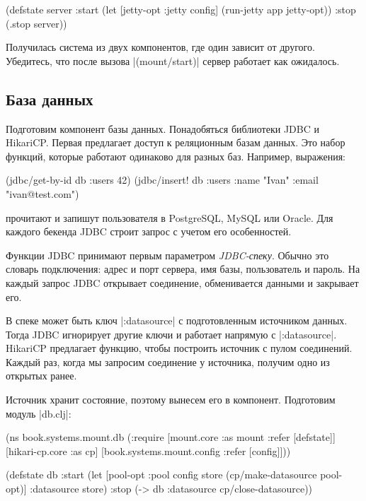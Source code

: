 \begin{english}
  \begin{clojure}
(defstate
  server
  :start
  (let [{jetty-opt :jetty} config]
    (run-jetty app jetty-opt))
  :stop (.stop server))
  \end{clojure}
\end{english}

Получилась система из двух компонентов, где один зависит от другого. Убедитесь,
что после вызова \spverb|(mount/start)| сервер работает как ожидалось.

\subsection{База данных}

Подготовим компонент базы данных. Понадобяться библиотеки
JDBC и
HikariCP. Первая предлагает доступ
к реляционным базам данных. Это набор функций, которые работают одинаково для
разных баз. Например, выражения:

\begin{english}
  \begin{clojure}
(jdbc/get-by-id db :users 42)
(jdbc/insert! db :users {:name "Ivan" :email "ivan@test.com"})
  \end{clojure}
\end{english}

\noindent
прочитают и запишут пользователя в PostgreSQL, MySQL или Oracle. Для каждого
бекенда JDBC строит запрос с учетом его особенностей.

Функции JDBC принимают первым параметром \emph{JDBC-спеку}. Обычно это словарь
подключения: адрес и порт сервера, имя базы, пользователь и пароль. На каждый
запрос JDBC открывает соединение, обменивается данными и закрывает его.

В спеке может быть ключ \spverb|:datasource| с подготовленным источником
данных. Тогда JDBC игнорирует другие ключи и работает напрямую с
\spverb|:datasource|. HikariCP предлагает функцию, чтобы построить источник с
пулом соединений. Каждый раз, когда мы запросим соединение у источника, получим
одно из открытых ранее.

Источник хранит состояние, поэтому вынесем его в компонент. Подготовим модуль
\spverb|db.clj|:

\begin{english}
  \begin{clojure}
(ns book.systems.mount.db
  (:require
   [mount.core :as mount :refer [defstate]]
   [hikari-cp.core :as cp]
   [book.systems.mount.config :refer [config]]))

(defstate db
  :start
  (let [{pool-opt :pool} config
        store (cp/make-datasource pool-opt)]
    {:datasource store})
  :stop
  (-> db :datasource cp/close-datasource))
  \end{clojure}
\end{english}

